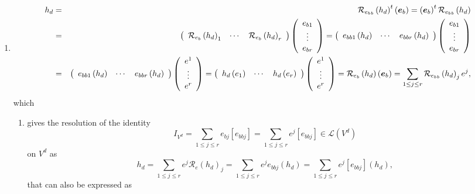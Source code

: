 \documentclass[aps,preprint]{revtex4}
\begin{document}
\begin{enumerate}
\item 
\begin{eqnarray}
h_{d} &=&\mathcal{R}_{e_{b}{}_{b}}\left( h_{d}\right) ^{t}\left( \boldsymbol{%
e}_{b}\right) =\left( \boldsymbol{e}_{b}\right) ^{t}\mathcal{R}%
_{e_{b}{}_{b}}\left( h_{d}\right) \\
&=&\left( 
\begin{array}{ccc}
\mathcal{R}_{e_{b}{}}\left( h_{d}\right) _{1} & \cdots & \mathcal{R}%
_{e_{b}{}}\left( h_{d}\right) _{r}%
\end{array}%
\right) \left( 
\begin{array}{c}
e_{b1} \\ 
\vdots \\ 
e_{br}%
\end{array}%
\right) =\left( 
\begin{array}{ccc}
e_{bb1}\left( h_{d}\right) & \cdots & e_{bbr}\left( h_{d}\right)%
\end{array}%
\right) \left( 
\begin{array}{c}
e_{b1} \\ 
\vdots \\ 
e_{br}%
\end{array}%
\right) \\
&=&\left( 
\begin{array}{ccc}
e_{bb1}\left( h_{d}\right) & \cdots & e_{bbr}\left( h_{d}\right)%
\end{array}%
\right) \left( 
\begin{array}{c}
e^{1} \\ 
\vdots \\ 
e^{r}%
\end{array}%
\right) =\left( 
\begin{array}{ccc}
h_{d}\left( e_{1}\right) & \cdots & h_{d}\left( e_{r}\right)%
\end{array}%
\right) \left( 
\begin{array}{c}
e^{1} \\ 
\vdots \\ 
e^{r}%
\end{array}%
\right) =\mathcal{R}_{e_{b}{}}\left( h_{d}\right) \left( \boldsymbol{e}%
_{b}\right) =\sum_{1\leq j\leq r}\mathcal{R}_{e_{b}{}_{b}}\left(
h_{d}\right) _{j}e^{j},
\end{eqnarray}%
which

\begin{enumerate}
\item gives the resolution of the identity 
\begin{equation}
I_{V^{d}}=\sum_{1\leq j\leq r}e_{bj}\left[ e_{bbj}\right] =\sum_{1\leq j\leq
r}e^{j}\left[ e_{bbj}\right] \in \mathcal{L}\left( V^{d}\right)
\end{equation}%
on $V^{d}$ as 
\begin{equation}
h_{d}=\sum_{1\leq j\leq r}e^{j}\mathcal{R}_{e}\left( h_{d}\right)
_{j}=\sum_{1\leq j\leq r}e^{j}e_{bbj}\left( h_{d}\right) =\sum_{1\leq j\leq
r}e^{j}\left[ e_{bbj}\right] \left( h_{d}\right) ,
\end{equation}%
that can also be expressed as


\end{enumerate}
\end{enumerate}
\end{document}
